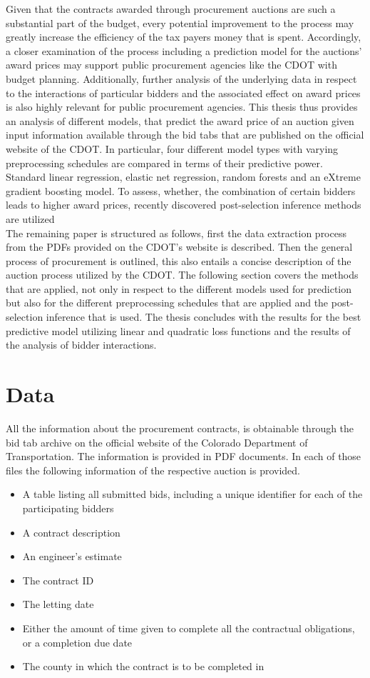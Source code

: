 \documentclass[a4paper,12pt, headsepline]{scrartcl}
\numberwithin{equation}{section}
\begin{document}
Given that the contracts awarded through procurement auctions are such a substantial part of the budget, every potential improvement to the process may greatly increase the efficiency of the tax payers money that is spent. Accordingly, a closer examination of the process including a prediction model for the auctions' award prices may support public procurement agencies like the CDOT with budget planning. Additionally, further analysis of the underlying data in respect to the interactions of particular bidders and the associated effect on award prices is also highly relevant for public procurement agencies. This thesis thus provides an analysis of different models, that predict the award price of an auction given input information available through the bid tabs that are published on the official website of the CDOT. In particular, four different model types with varying preprocessing schedules are compared in terms of their predictive power. Standard linear regression, elastic net regression, random forests and an eXtreme gradient boosting model. To assess, whether, the combination of certain bidders leads to higher award prices, recently discovered post-selection inference methods are utilized \citep{selectiveInference}\\
The remaining paper is structured as follows, first the data extraction process from the PDFs provided on the CDOT's website is described. Then the general process of procurement is outlined, this also entails a concise description of the auction process utilized by the CDOT. The following section covers the methods that are applied, not only in respect to the different models used for prediction but also for the different preprocessing schedules that are applied and the post-selection inference that is used. The thesis concludes with the results for the best predictive model utilizing linear and quadratic loss functions and the results of the analysis of bidder interactions.
\newpage
\section{Data}\label{sec:data}

All the information about the procurement contracts, is obtainable through the bid tab archive on the official website of the Colorado Department of Transportation. The information is provided in PDF documents. In each of those files the following information of the respective auction is provided.

\begin{itemize}
	\item A table listing all submitted bids, including a unique identifier for each of the participating bidders
	\item A contract description
	\item An engineer's estimate
	\item The contract ID
	\item The letting date
	\item Either the amount of time given to complete all the contractual obligations, or a completion due date
	\item The county in which the contract is to be completed in 
\end{itemize}
\end{document}
